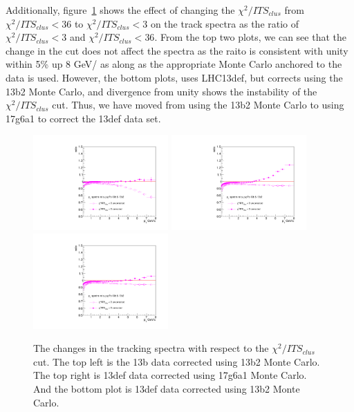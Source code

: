 Additionally, figure~\ref{fig:chi2SpectraComparison} shows the effect of changing the $\chi^2/ITS_{clus}$ from $\chi^2/ITS_{clus} < 36$ to $\chi^2/ITS_{clus} < 3$ on the track \pt spectra as the ratio of $\chi^2/ITS_{clus} <3$ and $\chi^2/ITS_{clus} < 36$. From the top two plots, we can see that the change in the cut does not affect the \pt spectra as the raito is consistent with unity within 5\% up 8 GeV/ as along as the appropriate Monte Carlo anchored to the data is used. However, the bottom plots, uses LHC13def, but corrects using the 13b2 Monte Carlo, and divergence from unity shows the instability of the $\chi^2/ITS_{clus}$ cut. Thus, we have moved from using the 13b2 Monte Carlo to using 17g6a1 to correct the 13def data set.
\begin{figure}[h]
\center
\includegraphics[width=0.46\textwidth]{Appendices/ITSchi2_study_ptSpectra_ratio_MBMB.pdf}
\includegraphics[width=0.46\textwidth]{Appendices/ITSchi2_study_ptSpectra_ratio_MBGJ.pdf}
\includegraphics[width=0.46\textwidth]{Appendices/ITSchi2_study_ptSpectra_ratio_GJGJ.pdf}
\caption{The changes in the tracking spectra with respect to the $\chi^2/ITS_{clus}$ cut. The top left is the 13b data corrected using 13b2 Monte Carlo. The top right is 13def data corrected using 17g6a1 Monte Carlo. And the bottom plot is 13def data corrected using 13b2 Monte Carlo.}
\label{fig:chi2SpectraComparison}
\end{figure}

